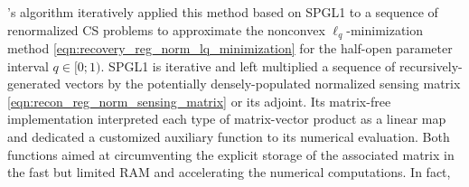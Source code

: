 's algorithm
\cite[Sect. 4]{article:FoucartACHA2009} iteratively applied
this method based on
\ac{SPGL1} to
a sequence of
renormalized \ac{CS} problems to approximate
the nonconvex $\ell_{q}$-minimization method
\eqref{eqn:recovery_reg_norm_lq_minimization} for
the half-open parameter interval
$q \in [ 0; 1 )$.
\ac{SPGL1} is
iterative and left multiplied
a sequence of
recursively-generated vectors by
the potentially densely-populated normalized sensing matrix
\eqref{eqn:recon_reg_norm_sensing_matrix} or
its adjoint.
Its matrix-free implementation interpreted
each type of
matrix-vector product as
a linear map and dedicated
a customized auxiliary function to
its numerical evaluation.
Both functions aimed at
circumventing
the explicit storage of
the associated matrix in
the fast but limited \ac{RAM} and
accelerating
the numerical computations.
In fact,
